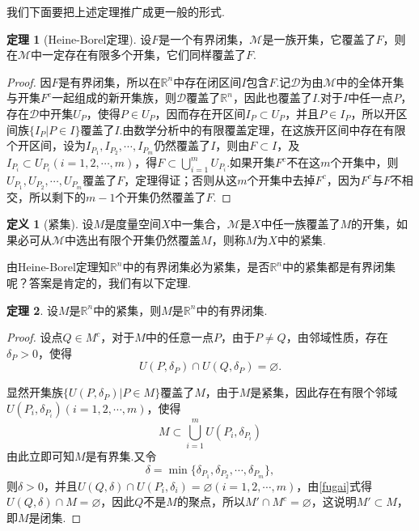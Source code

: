\documentclass[lang=cn,12pt]{ctexart}
\theoremstyle{definition}
\newtheorem{definition}{定义}
\newtheorem{theorem}{定理}
\theoremstyle{plain}
\begin{document}
我们下面要把上述定理推广成更一般的形式.
\begin{theorem}[Heine-Borel定理]
	设$F$是一个有界闭集，$\mathcal{M}$是一族开集，它覆盖了$F$，则在$\mathcal{M}$中一定存在有限多个开集，它们同样覆盖了$F$.
\end{theorem}
\begin{proof}
	因$F$是有界闭集，所以在$\mathbb{R}^n$中存在闭区间$I$包含$F$.记$\mathcal{D}$为由$\mathcal{M}$中的全体开集与开集$F^c$一起组成的新开集族，则$\mathcal{D}$覆盖了$\mathbb{R}^n$，因此也覆盖了$I$.对于$I$中任一点$P$，存在$\mathcal{D}$中开集$U_P$，使得$P\in U_P$，因而存在开区间$I_P\subset U_P$，并且$P\in I_P$，所以开区间族$\{I_P|P\in I\}$覆盖了$I$.由数学分析中的有限覆盖定理，在这族开区间中存在有限个开区间，设为$I_{P_1},I_{P_2},\cdots,I_{P_m}$仍然覆盖了$I$，则由$F\subset I$，及$I_{P_i}\subset U_{P_i}(i=1,2,\cdots,m)$，得$F\subset\bigcup\limits_{i=1}^{m}U_{P_i}$.如果开集$F^c$不在这$m$个开集中，则$U_{P_1},U_{P_2},\cdots,U_{P_m}$覆盖了$F$，定理得证；否则从这$m$个开集中去掉$F^c$，因为$F^c$与$F$不相交，所以剩下的$m-1$个开集仍然覆盖了$F$.
\end{proof}
\begin{definition}[紧集]
	设$M$是度量空间$X$中一集合，$\mathcal{M}$是$X$中任一族覆盖了$M$的开集，如果必可从$\mathcal{M}$中选出有限个开集仍然覆盖$M$，则称$M$为$X$中的{\heiti 紧集}.
\end{definition}
由Heine-Borel定理知$\mathbb{R}^n$中的有界闭集必为紧集，是否$\mathbb{R}^n$中的紧集都是有界闭集呢？答案是肯定的，我们有以下定理.
\begin{theorem}
	设$M$是$\mathbb{R}^n$中的紧集，则$M$是$\mathbb{R}^n$中的有界闭集.
\end{theorem}
\begin{proof}
	设点$Q\in M^c$，对于$M$中的任意一点$P$，由于$P\neq Q$，由邻域性质，存在$\delta_P>0$，使得
	$$U(P,\delta_P)\cap U(Q,\delta_P)=\varnothing.$$
	
	显然开集族$\{U(P,\delta_P)|P\in M\}$覆盖了$M$，由于$M$是紧集，因此存在有限个邻域$U(P_i,\delta_{P_i})(i=1,2,\cdots,m)$，使得
	\begin{equation}\label{fugai}
		M\subset\bigcup\limits_{i=1}^{m}U(P_i,\delta_{P_i})
	\end{equation}
	由此立即可知$M$是有界集.又令
	$$\delta=\min\{\delta_{P_1},\delta_{P_2},\cdots,\delta_{P_m}\},$$
	则$\delta>0$，并且$U(Q,\delta)\cap U(P_i,\delta_i)=\varnothing(i=1,2,\cdots,m)$，由\ref{fugai}式得$U(Q,\delta)\cap M=\varnothing$，因此$Q$不是$M$的聚点，所以$M'\cap M^c=\varnothing$，这说明$M'\subset M$，即$M$是闭集.
\end{proof}
\end{document}
